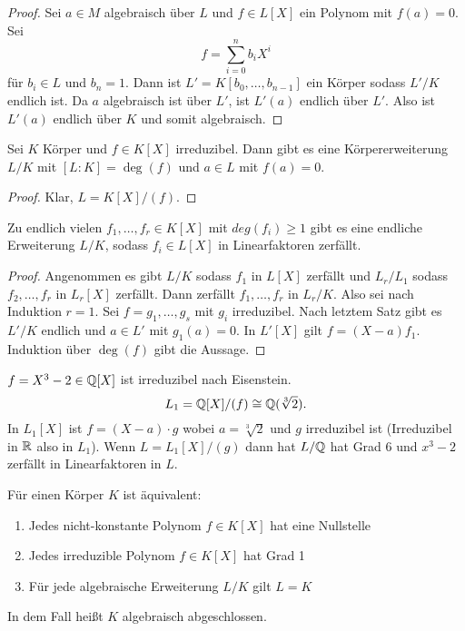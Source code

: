 \begin{proof}
    Sei \(a\in M\) algebraisch über \(L\) und \(f\in L[X]\) ein Polynom mit \(f(a)=0\). Sei \[f=\sum\limits_{i=0}^nb_iX^i\] für \(b_i\in L\) und \(b_n=1\).
    Dann ist \(L'=K[b_0,\dots,b_{n-1}]\) ein Körper sodass \(L'/K\) endlich ist.
    Da \(a\) algebraisch ist über \(L'\), ist \(L'(a)\) endlich über \(L'\). Also ist \(L'(a)\) endlich über \(K\) und somit algebraisch.
\end{proof}
\begin{Satz}
    Sei \(K\) Körper und \(f\in K[X]\) irreduzibel. Dann gibt es eine Körpererweiterung \(L/K\) mit \([L:K]=\deg(f)\) und \(a\in L\) mit \(f(a)=0\).
    
\end{Satz}
\begin{proof}
    Klar, \(L=K[X]/(f)\).
\end{proof}
\begin{Kor}\label{Kor:ExZerfall}
    Zu endlich vielen \(f_1,\dots,f_r\in K[X]\) mit \(deg(f_i)\geq 1\) gibt es eine endliche Erweiterung \(L/K\), sodass \(f_i\in L[X]\) in Linearfaktoren zerfällt.
\end{Kor}
\begin{proof}
    Angenommen es gibt \(L/K\) sodass \(f_1\) in \(L[X]\) zerfällt und \(L_r/L_1\) sodass \(f_2,\dots,f_r\) in \(L_r[X]\) zerfällt. Dann zerfällt \(f_1,\dots,f_r\) in \(L_r/K\).
    Also sei nach Induktion \(r=1\).
    Sei \(f=g_1,\dots,g_s\) mit \(g_i\) irreduzibel.
    Nach letztem Satz gibt es \(L'/K\) endlich und \(a\in L'\) mit \(g_1(a)=0\).
    In \(L'[X]\) gilt \(f=(X-a)f_1\).
    Induktion über \(\deg(f)\) gibt die Aussage.
\end{proof}
\begin{Bsp}
    \(f=X^3-2\in\mathbb{Q}[X]\) ist irreduzibel nach Eisenstein.
    \[L_1=\mathbb{Q}[X]/(f)\cong \mathbb{Q}(\sqrt[3]{2}).\] In \(L_1[X]\) ist \(f=(X-a)\cdot g\) wobei \(a=\sqrt[3]{2}\) und \(g\) irreduzibel ist (Irreduzibel in \(\mathbb{R}\) also in \(L_1\)).
    Wenn \(L=L_1[X]/(g)\) dann hat \(L/\mathbb{Q}\) hat Grad \(6\) und \(x^3-2\) zerfällt in Linearfaktoren in \(L\).
\end{Bsp}
\begin{Lemma}

 Für einen Körper \(K\) ist äquivalent:

\begin{enumerate}

 \item Jedes nicht-konstante Polynom \(f\in K[X]\) hat eine Nullstelle

\item Jedes irreduzible Polynom \(f\in K[X]\) hat Grad 1

\item Für jede algebraische Erweiterung \(L/K\) gilt \(L=K\)

\end{enumerate}

In dem Fall heißt \(K\) algebraisch abgeschlossen.

\end{Lemma}

